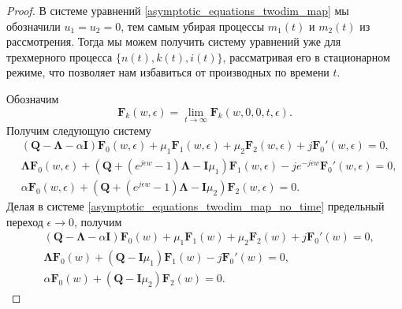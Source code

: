 \begin{proof}
	В системе уравнений \eqref{asymptotic_equations_twodim_map} мы обозначили $u_{1} = u_{2} = 0$, тем самым убирая процессы $m_{1}(t)$ и $m_{2}(t)$ из рассмотрения. Тогда мы можем получить систему уравнений уже для трехмерного процесса $\{n(t),k(t),i(t)\}$, рассматривая его в стационарном режиме, что позволяет нам избавиться от производных по времени $t$.
	
	Обозначим 
	\begin{equation*}
		\boldsymbol{F}_{k}(w,\epsilon) = \lim_{t \xrightarrow{} \infty} \boldsymbol{F}_{k}(w,0,0,t,\epsilon).
	\end{equation*}
Получим следующую систему
\begin{equation}
		 \label{asymptotic_equations_twodim_map_no_time}
		 \begin{split}
		 &(\boldsymbol{Q}-\boldsymbol{\Lambda}-\alpha\boldsymbol{I})\boldsymbol{F}_{0}(w,\epsilon) + \mu_{1} \boldsymbol{F}_{1}(w,\epsilon)  +  \mu_{2}\boldsymbol{F}_{2}(w,\epsilon) + j
		 \boldsymbol{F}_{0}'(w,\epsilon)  = 0,
		\\
		 &\boldsymbol{\Lambda} \boldsymbol{F}_{0}(w,\epsilon) +  (\boldsymbol{Q}+(e^{j\epsilon w}-1)\boldsymbol{\Lambda} - \boldsymbol{I}\mu_{1})\boldsymbol{F}_{1}(w,\epsilon) - j e^{-j\epsilon w}
		 \boldsymbol{F}_{0}'(w,\epsilon)  = 0,
		\\
		&\alpha \boldsymbol{F}_{0}(w,\epsilon) + (\boldsymbol{Q}+(e^{j\epsilon w}-1)\boldsymbol{\Lambda} - \boldsymbol{I}\mu_{2})\boldsymbol{F}_{2}(w,\epsilon)  = 0.
	\end{split}
\end{equation}  
Делая в системе \eqref{asymptotic_equations_twodim_map_no_time} предельный переход $\epsilon \xrightarrow{} 0$, получим
\begin{equation}
	\label{asymptotic_equations_twodim_map_no_limit}
	\begin{split}
		&(\boldsymbol{Q}-\boldsymbol{\Lambda}-\alpha\boldsymbol{I})\boldsymbol{F}_{0}(w) + \mu_{1} \boldsymbol{F}_{1}(w)  +  \mu_{2}\boldsymbol{F}_{2}(w) + j
		\boldsymbol{F}_{0}'(w)  = 0,
		\\
		&\boldsymbol{\Lambda} \boldsymbol{F}_{0}(w) +  (\boldsymbol{Q} - \boldsymbol{I}\mu_{1})\boldsymbol{F}_{1}(w) - j
		\boldsymbol{F}_{0}'(w)  = 0,
		\\
		&\alpha \boldsymbol{F}_{0}(w) + (\boldsymbol{Q} - \boldsymbol{I}\mu_{2})\boldsymbol{F}_{2}(w)  = 0.
	\end{split}
\end{equation}


\end{proof}
